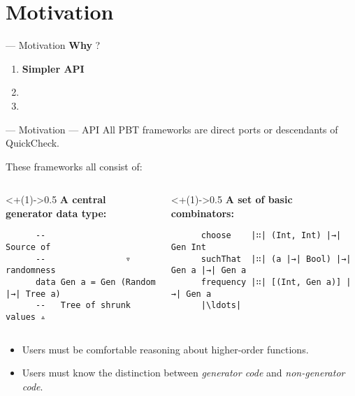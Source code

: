 \section{Motivation}

\begin{frame}{\halcheck{} --- Motivation}
  \textbf{Why} \halcheck{}?

  \begin{enumerate}
    \item \textbf{Simpler API}
    \item
    \item
  \end{enumerate}
\end{frame}

\begin{frame}[fragile]{\halcheck{} --- Motivation --- API}
  All PBT frameworks are direct ports or descendants of QuickCheck.

  These frameworks all consist of:

  \bigskip{}

  \begin{columns}
    \begin{column}<+(1)->{0.5\textwidth}
      \textbf{A central generator data type:}
      \begin{verbatim}
      --                  Source of
      --                ▿ randomness
      data Gen a = Gen (Random |→| Tree a)
      --   Tree of shrunk values ▵
      \end{verbatim}
    \end{column}

    \begin{column}<+(1)->{0.5\textwidth}
      \textbf{A set of basic combinators:}
      \begin{verbatim}
      choose    |∷| (Int, Int) |→| Gen Int
      suchThat  |∷| (a |→| Bool) |→| Gen a |→| Gen a
      frequency |∷| [(Int, Gen a)] |→| Gen a
      |\ldots|
      \end{verbatim}
    \end{column}
  \end{columns}

  \pause{}

  \bigskip{}

  \begin{itemize}
    \item Users must be comfortable reasoning about higher-order functions.
    \item Users must know the distinction between \emph{generator code} and \emph{non-generator code}.
  \end{itemize}
\end{frame}

